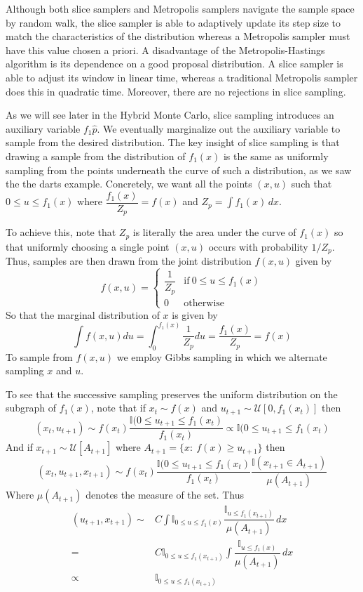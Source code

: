 \documentclass[11pt, a4paper]{article}
\theoremstyle{plain}
\theoremstyle{definition}
\begin{document}
Although both slice samplers and Metropolis samplers
navigate the sample space by random walk, the slice sampler
is able to adaptively update its step size to match the characteristics
of the distribution whereas a Metropolis
sampler must have this value chosen a priori. A disadvantage of the Metropolis-Hastings
algorithm is its dependence on a good proposal
distribution. A slice sampler is able to adjust its window in linear time, 
whereas a traditional Metropolis
sampler does this in quadratic time. Moreover, there are no rejections
in slice sampling.

As we will see later in the Hybrid Monte Carlo, slice sampling introduces
an auxiliary variable $f_1\hat{p}$. We eventually marginalize out the
auxiliary variable to sample from the desired distribution. The key insight of slice sampling
is that drawing a sample from the distribution of $f_1(x)$ is the same
as uniformly sampling from the points underneath the curve of such a distribution,
as we saw the the darts example. 
Concretely, we want all the points $(x, u)$ such that $0 \le u \le f_1(x)$ 
where $\dfrac{f_1(x)}{Z_p} = f(x)$ and $Z_p = \int f_1(x)\,dx$. 

To achieve this, note that $Z_p$ is literally the area under the curve
of $f_1(x)$ so that uniformly choosing a single point $(x, u)$ occurs
with probability $1/Z_p$. Thus, samples are then drawn from the joint distribution
$f(x, u)$ given by
 \begin{displaymath}
   f(x, u) = \left\{
     \begin{array}{lr}
        \dfrac{1}{Z_p} &\mbox{if}~0 \le u \le f_1(x)\\
       0 & \text{otherwise}
     \end{array}
   \right.
\end{displaymath} 
So that the marginal distribution of $x$ is given by
$$\int f(x, u) du = \int_0^{f_1(x)}\dfrac{1}{Z_p}du =\dfrac{f_1(x)}{Z_p} = f(x)$$
To sample from $f(x, u)$ we employ Gibbs sampling in which we alternate
sampling $x$ and $u$. 


To see that the successive sampling preserves the uniform distribution on the subgraph of 
$f_1(x)$, note that if $x_{t} \sim f(x)$ and $u_{t+1} \sim
\mathcal{U}[0, f_1(x_{t})]$ then $$(x_{t}, u_{t+1}) \sim f(x_{t})\dfrac{\mathbb{I}(0 \le u_{t+1} \le f_1(x_{t})}{f_1(x_{t})} \propto \mathbb{I}(0 \le u_{t+1} \le f_1(x_{t})$$
And if $x_{t+1} \sim \mathcal{U}[A_{t+1}]$ where $A_{t+1} = \{x : ~f(x) \ge u_{t+1}\}$ then $$(x_{t}, u_{t+1}, x_{t+1}) \sim f(x_{t})\dfrac{\mathbb{I}(0 \le u_{t+1} \le f_1(x_{t})}{f_1(x_{t})}\dfrac{\mathbb{I}(x_{t+1} \in A_{t+1})}{\mu(A_{t+1})}$$
Where $\mu(A_{t+1})$ denotes the measure of the set. Thus
\begin{align*}
(u_{t+1}, x_{t+1}) \sim{}& C \int \mathbb{I}_{0\le u \le f_1(x)}\dfrac{\mathbb{I}_{u \le f_1(x_{t+1})}}{\mu(A_{t+1})}\,dx\\
={}& C\mathbb{I}_{0\le u \le f_1(x_{t+1})} \int \dfrac{\mathbb{I}_{u \le f_1(x)}}{\mu(A_{t+1})}\,dx\\
\propto{}& \mathbb{I}_{0\le u \le f_1(x_{t+1})}
\end{align*}
\end{document}
